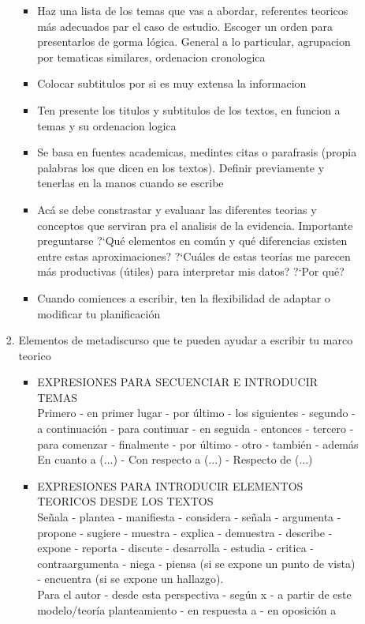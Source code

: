 \documentclass[a4paper,14pt]{article}
\begin{document}
\begin{itemize}
\begin{enumerate}
\begin{enumerate}
\begin{itemize}
\item Haz una lista de los temas que vas a abordar, referentes teoricos más adecuados par el caso de estudio. Escoger un orden para presentarlos de gorma lógica. General a lo particular, agrupacion por tematicas similares, ordenacion cronologica
\item Colocar subtitulos por si es muy extensa la informacion
\item Ten presente los titulos y subtitulos de los textos, en funcion a temas y su ordenacion logica
\item Se basa en fuentes academicas, medintes citas o parafrasis (propia palabras los que dicen en los textos). Definir previamente y tenerlas en la manos cuando se escribe
\item Acá se debe constrastar y evaluaar las diferentes teorias y conceptos que serviran pra el analisis de la evidencia. Importante preguntarse ?`Qué elementos en común y qué diferencias existen entre estas aproximaciones? ?`Cuáles de estas teorías me parecen más productivas (útiles) para interpretar mis datos? ?`Por qué?
\item Cuando comiences a escribir, ten la flexibilidad de adaptar o modificar tu planificación
\end{itemize}
\item Elementos de metadiscurso que te pueden ayudar a escribir tu marco teorico
\begin{itemize}
\item EXPRESIONES PARA SECUENCIAR E INTRODUCIR TEMAS\\
Primero - en primer lugar - por último - los siguientes - segundo - a continuación - para continuar - en seguida - entonces - tercero - para comenzar - finalmente - por último - otro - también - además\\
    En cuanto a (...) - Con respecto a (...) - Respecto de (...)
\item EXPRESIONES PARA INTRODUCIR ELEMENTOS TEORICOS DESDE LOS TEXTOS\\
Señala - plantea - manifiesta - considera - señala - argumenta - propone - sugiere - muestra - explica - demuestra - describe - expone - reporta - discute - desarrolla - estudia - critica - contraargumenta - niega - piensa (si se expone un punto de vista) - encuentra (si se expone un hallazgo).\\
Para el autor - desde esta perspectiva - según x - a partir de este modelo/teoría planteamiento - en respuesta a - en oposición a


\end{itemize}
\end{enumerate}
\end{enumerate}
\end{itemize}
\end{document}
